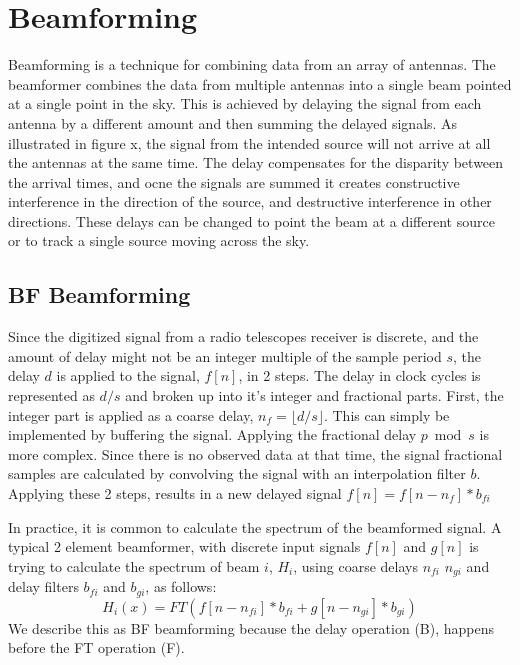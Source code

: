\cite{Bailes:2011iy}

\section{Beamforming}
\label{Real Time Radio Astronomy Algorithms:Beamforming}
Beamforming is a technique for combining data from an array of antennas.
The beamformer combines the data from multiple antennas into a single beam pointed at a single point in the sky.
This is achieved by delaying the signal from each antenna by a different amount and then summing the delayed signals. 
As illustrated in figure x, %
the signal from the intended source will not arrive at all the antennas at the same time. 
The delay compensates for the disparity between the arrival times, and ocne the signals are summed it creates constructive interference in the direction of the source, and destructive interference in other directions. 
These delays can be changed to point the beam at a different source or to track a single source moving across the sky.


\subsection{BF Beamforming}
Since the digitized signal from a radio telescopes receiver is discrete, and the amount of delay might not be an integer multiple of the sample period $s$, the delay $d$ is applied to the signal, $f[n]$, in 2 steps. 
The delay in clock cycles is represented as $d/s$ and broken up into it's integer and fractional parts. 
First, the integer part is applied as a coarse delay, $n_f = \lfloor d/s \rfloor$. 
This can simply be implemented by buffering the signal.
Applying the  fractional delay $p \bmod s$ is more complex. 
Since there is no observed data at that time, the signal fractional samples are calculated by convolving the signal with an interpolation filter $b$.
Applying these 2 steps, results in a new delayed signal $f[n] = f[n-n_f]\ast b_{fi}$

In practice, it is common to calculate the spectrum of the beamformed signal. 
A typical 2 element beamformer, with discrete input signals $f[n]$ and $g[n]$ is trying to calculate the spectrum of beam $i$, $H_i$, using coarse delays $n_{fi}$  $n_{gi}$ and delay filters $b_{fi}$ and $b_{gi}$, as follows: 
\[H_i(x) = FT(f[n-n_{fi}]\ast b_{fi} + g[n-n_{gi}]\ast b_{gi})\]
We describe this as BF beamforming because the delay operation (B), happens before the FT operation (F).

